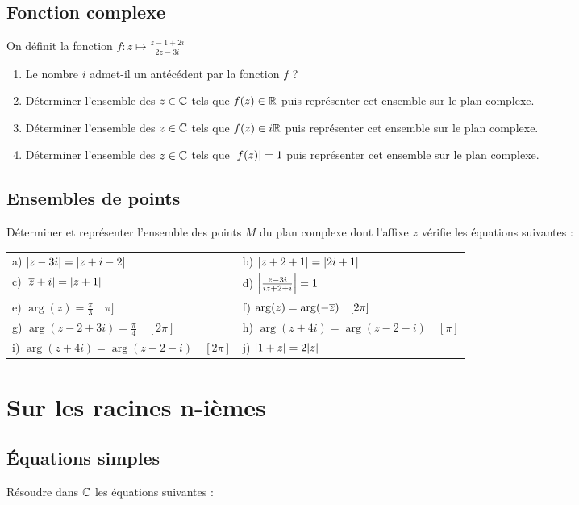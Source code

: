 \documentclass[oneside,12pt]{book}          %
\begin{document}
\subsection{Fonction complexe}
On définit la fonction $f:z\mapsto\frac{z-1+2i}{2z-3i}$
\begin{enumerate}
	\item Le nombre $i$ admet-il un antécédent par la fonction $f$ ?
	\item Déterminer l'ensemble des ${z\in\mathbb C}$ tels que $f(z)\in{\mathbb R}$ puis représenter cet ensemble sur le plan complexe.
	\item Déterminer l'ensemble des ${z\in\mathbb C}$ tels que $f(z)\in i{\mathbb R}$ puis représenter cet ensemble sur le plan complexe. 
	\item Déterminer l'ensemble des ${z\in\mathbb C}$ tels que ${\left\lvert f(z) \right\rvert}=1$ puis représenter cet ensemble sur le plan complexe. 
\end{enumerate}




\subsection{Ensembles de points}
Déterminer et représenter l'ensemble des points $M$ du plan complexe dont l'affixe $z$ vérifie les équations suivantes :

\begin{tabular}{p{} p{}}
    a) ${\left\lvert z-3i \right\rvert} = {\left\lvert z+i-2 \right\rvert} $ & b) ${\left\lvert z+2+1 \right\rvert}={\left\lvert 2i+1 \right\rvert} $ \\
    c) ${\left\lvert {\overline{z}}+i \right\rvert}={\left\lvert z+1 \right\rvert} $ & d) ${\left\lvert \frac{z-3i}{iz+2+i} \right\rvert} = 1$ \\
    e) $\arg(z)=\frac{\pi}{3} \quad\pi]$ & f) $\arg(z)=\arg(-{\overline{z}}) \quad[2\pi]$ \\
    g) $\arg(z-2+3i)=\frac{\pi}{4} \quad[2\pi]$ & h) $\arg(z+4i)=\arg(z-2-i) \quad[\pi]$ \\
    i) $\arg(z+4i)=\arg(z-2-i)\quad [2\pi]$ & j) ${\left\lvert 1+z \right\rvert}=2{\left\lvert z \right\rvert}$ \\     
\end{tabular}



\section{Sur les racines n-ièmes}

\subsection{Équations simples}
Résoudre dans ${\mathbb C}$ les équations suivantes :
\end{document}
